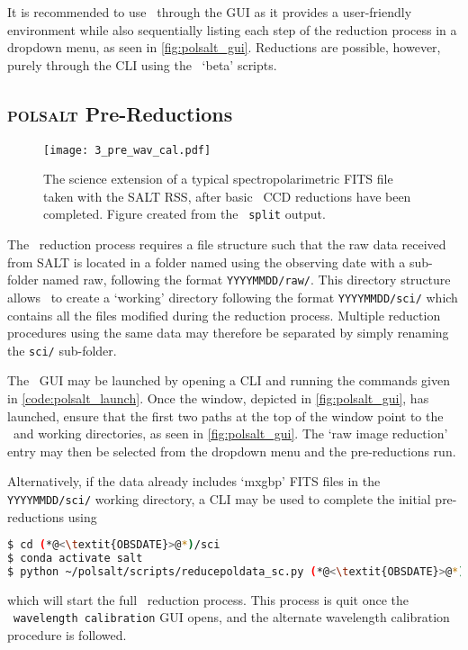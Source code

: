 It is recommended to use \polsalt\ through the \gls{GUI} as it provides a user-friendly environment while also sequentially listing each step of the reduction process in a dropdown menu, as seen in \autoref{fig:polsalt_gui}. Reductions are possible, however, purely through the \gls{CLI} using the \polsalt\ `beta' scripts.

\subsection{\textsc{polsalt} Pre-Reductions} \label{subsec:reduc_pre}

\begin{figure}[t]
    \centering
    \texttt{[image: 3\_pre\_wav\_cal.pdf]}
    \caption{The science extension of a typical spectropolarimetric \acs{FITS} file taken with the \gls{SALT} \gls{RSS}, after basic \polsalt\ \gls{CCD} reductions have been completed. Figure created from the \stops\ \texttt{split} output.}
    \label{fig:polsalt_pre_wav_cal}
\end{figure}

The \polsalt\ reduction process requires a file structure such that the raw data received from \gls{SALT} is located in a folder named using the observing date with a sub-folder named raw, following the format \texttt{YYYYMMDD/raw/}. This directory structure allows \polsalt\ to create a `working' directory following the format \texttt{YYYYMMDD/sci/} which contains all the files modified during the reduction process. Multiple reduction procedures using the same data may therefore be separated by simply renaming the \texttt{sci/} sub-folder.

The \polsalt\ \gls{GUI} may be launched by opening a \gls{CLI} and running the commands given in \autoref{code:polsalt_launch}. Once the window, depicted in \autoref{fig:polsalt_gui}, has launched, ensure that the first two paths at the top of the window point to the \polsalt\ and working directories, as seen in \autoref{fig:polsalt_gui}. The `raw image reduction' entry may then be selected from the dropdown menu and the pre-reductions run.

Alternatively, if the data already includes `mxgbp' \gls{FITS} files in the \texttt{YYYYMMDD/sci/} working directory, a \gls{CLI} may be used to complete the initial pre-reductions using
\begin{lstlisting}[language=bash]
$ cd (*@<\textit{OBSDATE}>@*)/sci
$ conda activate salt
$ python ~/polsalt/scripts/reducepoldata_sc.py (*@<\textit{OBSDATE}>@*)
\end{lstlisting}
{\parskip=0pt which} will start the full \polsalt\ reduction process. This process is quit once the \polsalt\ \texttt{wavelength calibration} \gls{GUI} opens, and the alternate wavelength calibration procedure is followed.

